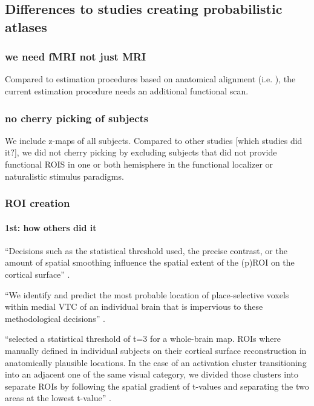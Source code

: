 \subsection{Differences to studies creating probabilistic atlases}

\subsubsection{we need fMRI not just MRI}

%
Compared to estimation procedures based on anatomical alignment (i.e.
\citep{weiner2018defining}), the current estimation procedure needs an
additional functional scan.


\subsubsection{no cherry picking of subjects}

%
We include z-maps of all subjects.
%
Compared to other studies [which studies did it?], we did not cherry picking by
excluding subjects that did not provide functional ROIS in one or both
hemisphere in the functional localizer or naturalistic stimulus paradigms.




\subsubsection{ROI creation}


\paragraph{1st: how others did it}


``Decisions such as the statistical threshold used, the precise contrast, or the
amount of spatial smoothing influence the spatial extent of the (p)ROI on the
cortical surface'' \citep{weiner2018defining}.

%
``We identify and predict the most probable location of place-selective voxels
within medial VTC of an individual brain that is impervious to these
methodological decisions'' \citep{weiner2018defining}.



\citet{rosenke2021probabilistic} ``selected a statistical threshold of t=3 for a
whole-brain map.
%
ROIs where manually defined in individual subjects on their cortical surface
reconstruction in anatomically plausible locations.
%
In the case of an activation cluster transitioning into an adjacent one of the
same visual category, we divided those clusters into separate ROIs by following
the spatial gradient of t-values and separating the two areas at the lowest
t-value'' \citep{rosenke2021probabilistic}.

